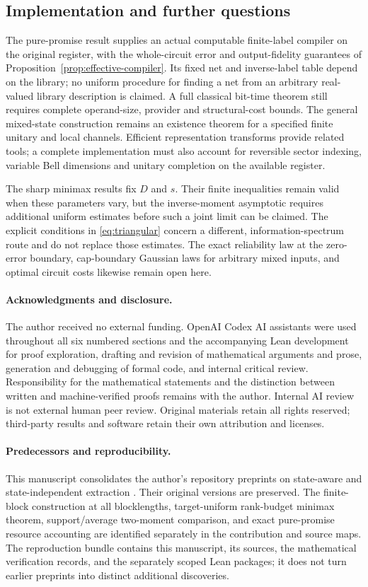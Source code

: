\subsection{Implementation and further questions}
The pure-promise result supplies an actual computable finite-label compiler on the original register, with the whole-circuit error and output-fidelity guarantees of Proposition~\ref{prop:effective-compiler}. Its fixed net and inverse-label table depend on the library; no uniform procedure for finding a net from an arbitrary real-valued library description is claimed. A full classical bit-time theorem still requires complete operand-size, provider and structural-cost bounds. The general mixed-state construction remains an existence theorem for a specified finite unitary and local channels. Efficient representation transforms \cite{bch,kirby,krovi} provide related tools; a complete implementation must also account for reversible sector indexing, variable Bell dimensions and unitary completion on the available register.

The sharp minimax results fix $D$ and $s$. Their finite inequalities remain valid when these parameters vary, but the inverse-moment asymptotic requires additional uniform estimates before such a joint limit can be claimed. The explicit conditions in \eqref{eq:triangular} concern a different, information-spectrum route and do not replace those estimates. The exact reliability law at the zero-error boundary, cap-boundary Gaussian laws for arbitrary mixed inputs, and optimal circuit costs likewise remain open here.

\paragraph{Acknowledgments and disclosure.}
The author received no external funding. OpenAI Codex AI assistants were used throughout all six numbered sections and the accompanying Lean development for proof exploration, drafting and revision of mathematical arguments and prose, generation and debugging of formal code, and internal critical review. Responsibility for the mathematical statements and the distinction between written and machine-verified proofs remains with the author. Internal AI review is not external human peer review. Original materials retain all rights reserved; third-party results and software retain their own attribution and licenses.

\paragraph{Predecessors and reproducibility.}
This manuscript consolidates the author's repository preprints on state-aware and state-independent extraction \cite{zhang-extraction,zhang-universal}. Their original versions are preserved. The finite-block construction at all blocklengths, target-uniform rank-budget minimax theorem, support/average two-moment comparison, and exact pure-promise resource accounting are identified separately in the contribution and source maps. The reproduction bundle contains this manuscript, its sources, the mathematical verification records, and the separately scoped Lean packages; it does not turn earlier preprints into distinct additional discoveries.
